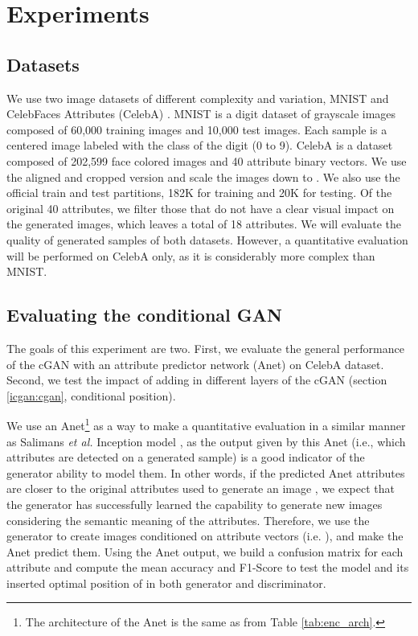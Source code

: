 \documentclass{article}
\begin{document}
\section{Experiments} \label{sec:experiments}
\subsection{Datasets} \label{subsec:data}
We use two image datasets of different complexity and variation, MNIST \citep{LeCun1998} and CelebFaces Attributes (CelebA) \citep{celeba}. MNIST is a digit dataset of grayscale images composed of 60,000 training images and 10,000 test images. Each sample is a  centered image labeled with the class of the digit (0 to 9). CelebA is a dataset composed of 202,599 face colored images and 40 attribute binary vectors. We use the aligned and cropped version and scale the images down to . We also use the official train and test partitions, 182K for training and 20K for testing. Of the original 40 attributes, we filter those that do not have a clear visual impact on the generated images, which leaves a total of 18 attributes. 
We will evaluate the quality of generated samples of both datasets. However, a quantitative evaluation will be performed on CelebA only, as it is considerably more complex than MNIST. 

\subsection{Evaluating the conditional GAN} \label{subsec:cGAN_exp}
The goals of this experiment are two. First, we evaluate the general performance of the cGAN with an attribute predictor network (Anet) on CelebA dataset. Second, we test the impact of adding  in different layers of the cGAN (section \ref{icgan:cgan}, conditional position). 

We use an Anet\footnote{The architecture of the Anet is the same as  from Table \ref{tab:enc_arch}.} as a way to make a quantitative evaluation in a similar manner as Salimans \textit{et al.} Inception model \cite{Salimans2016}, as the output given by this Anet (i.e., which attributes are detected on a generated sample) is a good indicator of the generator ability to model them. In other words, if the predicted Anet attributes  are closer to the original attributes  used to generate an image , we expect that the generator has successfully learned the capability to generate new images considering the semantic meaning of the attributes. Therefore, we use the generator  to create images  conditioned on attribute vectors  (i.e. ), and make the Anet predict them. Using the Anet output, we build a confusion matrix for each attribute and compute the mean accuracy and F1-Score to test the model and its inserted optimal position of  in both generator and discriminator.
\end{document}
